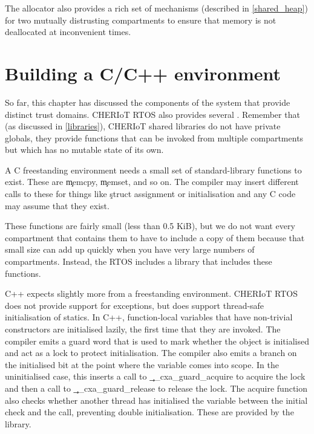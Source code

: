 The allocator also provides a rich set of mechanisms (described in \ref{shared_heap}) for two mutually distrusting compartments to ensure that memory is not deallocated at inconvenient times.

\section{Building a C/C++ environment}

So far, this chapter has discussed the components of the system that provide distinct trust domains.
CHERIoT RTOS also provides several .
Remember that (as discussed in \ref{libraries}), CHERIoT shared libraries do not have private globals, they provide functions that can be invoked from multiple compartments but which has no mutable state of its own.

A C freestanding environment needs a small set of standard-library functions to exist.
These are \c{memcpy}, \c{memset}, and so on.
The compiler may insert different calls to these for things like \c{struct} assignment or initialisation and any C code may assume that they exist.

These functions are fairly small (less than 0.5 KiB), but we do not want every compartment that contains them to have to include a copy of them because that small size can add up quickly when you have very large numbers of compartments.
Instead, the RTOS includes a  library that includes these functions.

C++ expects slightly more from a freestanding environment.
CHERIoT RTOS does not provide support for exceptions, but does support thread-safe initialisation of statics.
In C++, function-local  variables that have non-trivial constructors are initialised lazily, the first time that they are invoked.
The compiler emits a guard word that is used to mark whether the object is initialised and act as a lock to protect initialisation.
The compiler also emits a branch on the initialised bit at the point where the variable comes into scope.
In the uninitialised case, this inserts a call to \c{__cxa_guard_acquire} to acquire the lock and then a call to \c{__cxa_guard_release} to release the lock.
The acquire function also checks whether another thread has initialised the variable between the initial check and the call, preventing double initialisation.
These are provided by the  library.


